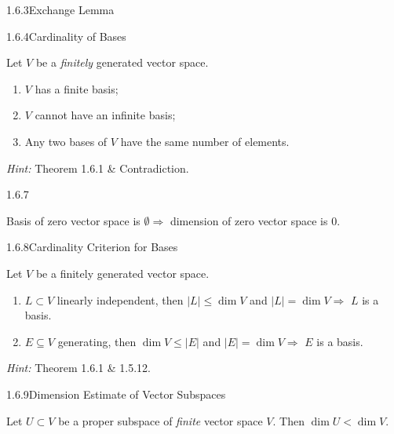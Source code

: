 \documentclass[10pt]{article} %
\renewcommand{\leq}{\leqslant}
\newcommand{\Hint}{\vspace{0.2em}\textit{Hint: }}
\begin{document}
\begin{multicols}{3}
\begin{lemma}{1.6.3}{Exchange Lemma}
\end{lemma}

\begin{corollary}{1.6.4}{Cardinality of Bases}

    Let $V$ be a \emph{finitely} generated vector space.

    \begin{enumerate}[(1)]
        \setlength{\parskip}{0em}
        \item $V$ has a finite basis;
        \item $V$ cannot have an infinite basis;
        \item Any two bases of $V$ have the same number of elements.
    \end{enumerate}

    \Hint Theorem 1.6.1 \& Contradiction.

\end{corollary}

\begin{example}{1.6.7}{}

    Basis of zero vector space is $\emptyset \Rightarrow$ dimension of zero vector space is $0$.

\end{example}

\begin{corollary}{1.6.8}{Cardinality Criterion for Bases}

    Let $V$ be a finitely generated vector space.

        \begin{enumerate}[(1)]
            \item $L \subset V$ linearly independent, then $|L| \leq \dim{V}$ and $|L| = \dim{V} \Rightarrow$ $L$ is a basis.
            \item $E \subseteq V$ generating, then $\dim{V} \leq |E|$ and $|E| = \dim{V} \Rightarrow$ $E$ is a basis.
        \end{enumerate}

    \Hint Theorem 1.6.1 \& 1.5.12.

\end{corollary}

\begin{corollary}{1.6.9}{Dimension Estimate of Vector Subspaces}

    Let $U \subset V$ be a proper subspace of \emph{finite} vector space $V$. Then $\dim{U} < \dim{V}$.


\end{corollary}
\end{multicols}
\end{document}
